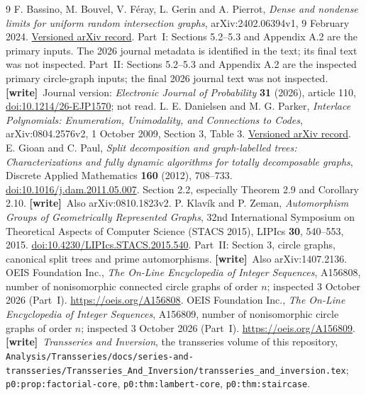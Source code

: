\documentclass[11pt,letterpaper]{article}
\numberwithin{equation}{section}
\theoremstyle{definition}\newtheorem{definition}[theorem]{Definition}
\theoremstyle{remark}\newtheorem{remark}[theorem]{Remark}
\newcommand{\file}[1]{\nolinkurl{#1}}
\newcommand{\wtag}{\textup{\textbf{[write]}}}
\begin{document}
\begin{thebibliography}{9}
F. Bassino, M. Bouvel, V. F\'eray, L. Gerin and A. Pierrot,
\emph{Dense and nondense limits for uniform random intersection
graphs}, arXiv:2402.06394v1, 9 February 2024.
\href{https://arxiv.org/abs/2402.06394v1}{Versioned arXiv record}.
Part~I: Sections 5.2--5.3 and Appendix A.2 are the primary inputs.
The 2026 journal metadata is identified in the text; its final
text was not inspected. Part~II: Sections 5.2--5.3 and Appendix A.2 are the inspected primary
circle-graph inputs; the final 2026 journal text was not inspected. \wtag\ Journal version: \emph{Electronic Journal of Probability} \textbf{31} (2026), article 110, \href{https://doi.org/10.1214/26-EJP1570}{doi:10.1214/26-EJP1570}; not read.
L. E. Danielsen and M. G. Parker,
\emph{Interlace Polynomials: Enumeration, Unimodality, and
Connections to Codes}, arXiv:0804.2576v2, 1 October 2009,
Section 3, Table 3.
\href{https://arxiv.org/abs/0804.2576v2}{Versioned arXiv record}.
E. Gioan and C. Paul,
\emph{Split decomposition and graph-labelled trees:
Characterizations and fully dynamic algorithms for totally
decomposable graphs}, Discrete Applied Mathematics
\textbf{160} (2012), 708--733.
\href{https://doi.org/10.1016/j.dam.2011.05.007}
{doi:10.1016/j.dam.2011.05.007}.
Section 2.2, especially Theorem 2.9 and Corollary 2.10. \wtag\ Also arXiv:0810.1823v2.
P. Klav\'ik and P. Zeman,
\emph{Automorphism Groups of Geometrically Represented Graphs},
32nd International Symposium on Theoretical Aspects of Computer
Science (STACS 2015), LIPIcs \textbf{30}, 540--553, 2015.
\href{https://doi.org/10.4230/LIPIcs.STACS.2015.540}
{doi:10.4230/LIPIcs.STACS.2015.540}.
Part~II: Section 3, circle graphs, canonical split trees and prime
automorphisms. \wtag\ Also arXiv:1407.2136.
OEIS Foundation Inc., \emph{The On-Line Encyclopedia of Integer
Sequences}, A156808, number of nonisomorphic connected circle
graphs of order $n$; inspected 3 October 2026 (Part~I).
\url{https://oeis.org/A156808}.
OEIS Foundation Inc., \emph{The On-Line Encyclopedia of Integer
Sequences}, A156809, number of nonisomorphic circle graphs of
order $n$; inspected 3 October 2026 (Part~I).
\url{https://oeis.org/A156809}.
\wtag\ \emph{Transseries and Inversion}, the transseries volume of this repository,
\file{Analysis/Transseries/docs/series-and-transseries/Transseries_And_Inversion/transseries_and_inversion.tex};
\texttt{p0:prop:factorial-core}, \texttt{p0:thm:lambert-core}, \texttt{p0:thm:staircase}.
\end{thebibliography}
\end{document}
